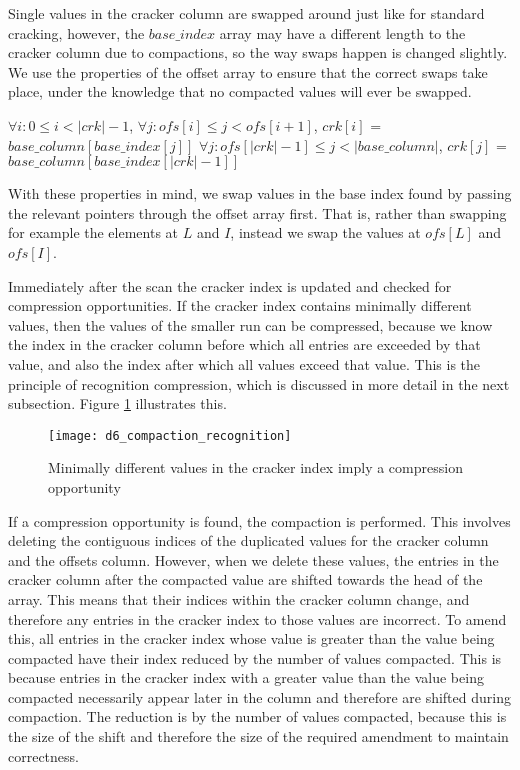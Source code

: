 Single values in the cracker column are swapped around just like for standard cracking, however, the $base\_index$ array may have a different length to the cracker column due to compactions, so the way swaps happen is changed slightly. We use the properties of the offset array to ensure that the correct swaps take place, under the knowledge that no compacted values will ever be swapped.

\begin{tcolorbox}
$\forall i: 0 \leq i < |crk|-1$, $\forall j: ofs[i] \leq j < ofs[i+1]$, $crk[i]$ = $base\_column[base\_index[j]]$
$\forall j: ofs[|crk|-1] \leq j < |base\_column|$, $crk[j]$ = $base\_column[base\_index[|crk|-1]]$
\end{tcolorbox}

With these properties in mind, we swap values in the base index found by passing the relevant pointers through the offset array first. That is, rather than swapping for example the elements at $L$ and $I$, instead we swap the values at $ofs[L]$ and $ofs[I]$.

Immediately after the scan the cracker index is updated and checked for compression opportunities. If the cracker index contains minimally different values, then the values of the smaller run can be compressed, because we know the index in the cracker column before which all entries are exceeded by that value, and also the index after which all values exceed that value. This is the principle of recognition compression, which is discussed in more detail in the next subsection. Figure \ref{fig:compaction_recognition} illustrates this.

\begin{figure}[H]
  \centering
  \texttt{[image: d6\_compaction\_recognition]}
  \caption{Minimally different values in the cracker index imply a compression opportunity}
  \label{fig:compaction_recognition}
\end{figure}

If a compression opportunity is found, the compaction is performed. This involves deleting the contiguous indices of the duplicated values for the cracker column and the offsets column. However, when we delete these values, the entries in the cracker column after the compacted value are shifted towards the head of the array. This means that their indices within the cracker column change, and therefore any entries in the cracker index to those values are incorrect. To amend this, all entries in the cracker index whose value is greater than the value being compacted have their index reduced by the number of values compacted. This is because entries in the cracker index with a greater value than the value being compacted necessarily appear later in the column and therefore are shifted during compaction. The reduction is by the number of values compacted, because this is the size of the shift and therefore the size of the required amendment to maintain correctness.

